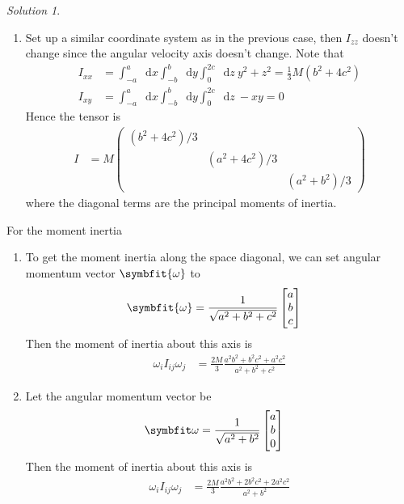 \documentclass[twoside,11pt]{article}
\renewcommand*\d{\mathop{}\!\mathrm{d}}
\theoremstyle{definition}
\theoremstyle{remark}
\newtheorem*{solution}{Solution}
\begin{document}
\begin{solution}
\begin{enumerate}[label=\roman*)]
\item Set up a similar coordinate system as in the previous case, then $I_{zz}$
doesn't change since the angular velocity axis doesn't change.
Note that
\begin{align*}
    I_{xx} &= \int_{-a}^a\d x \int_{-b}^b\d y \int_0^{2c}\d z~ y^2 + z^2
    = \frac{1}{3}M(b^2 + 4c^2)\\
    I_{xy} &= \int_{-a}^a\d x \int_{-b}^b\d y \int_0^{2c}\d z~ -xy
    = 0
\end{align*}
Hence the tensor is
\begin{align*}
    I &= M\begin{pmatrix}
        (b^2+4c^2)/3 & & \\
                     & (a^2+4c^2)/3 & \\
                     & & (a^2+b^2)/3
    \end{pmatrix}
\end{align*}
where the diagonal terms are the principal moments of inertia.
    
\end{enumerate}

For the moment inertia
\begin{enumerate}[label=\roman*)]
\item To get the moment inertia along the space diagonal, we can set angular
momentum vector $\symbfit{\omega}$ to
\begin{align*}
    \symbfit{\omega} &= \frac{1}{\sqrt{a^2+b^2+c^2}}\begin{bmatrix}
        a\\ b\\ c
    \end{bmatrix}
\end{align*}
Then the moment of inertia about this axis is
\begin{align*}
    \omega_i I_{ij}\omega_j &=
    \frac{2M}{3}\frac{a^2b^2+b^2c^2+a^2c^2}{a^2+b^2+c^2}
\end{align*}

\item Let the angular momentum vector be
\begin{align*}
    \symbfit\omega &= \frac{1}{\sqrt{a^2+b^2}}\begin{bmatrix}
        a \\ b \\ 0
    \end{bmatrix}
\end{align*}
Then the moment of inertia about this axis is
\begin{align*}
    \omega_i I_{ij}\omega_j &=
    \frac{2M}{3}\frac{a^2b^2 + 2b^2c^2 + 2a^2c^2}{a^2+b^2}
\end{align*}

\end{enumerate}

\end{solution}
\end{document}
